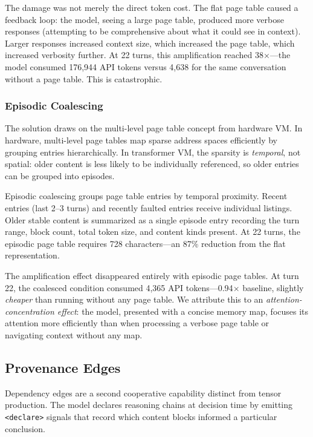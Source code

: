 \documentclass[sigplan,screen,anonymous]{acmart}
\begin{document}
The damage was not merely the direct token cost. The flat page table
caused a feedback loop: the model, seeing a large page table, produced
more verbose responses (attempting to be comprehensive about what it
could see in context). Larger responses increased context size, which
increased the page table, which increased verbosity further.
At 22 turns, this amplification reached 38$\times$---the model consumed
176,944 API tokens versus 4,638 for the same conversation without a
page table. This is catastrophic.

\subsubsection{Episodic Coalescing}

The solution draws on the multi-level page table concept from hardware
VM. In hardware, multi-level page tables map sparse address spaces
efficiently by grouping entries hierarchically. In transformer VM, the
sparsity is \emph{temporal}, not spatial: older content is less likely
to be individually referenced, so older entries can be grouped into
episodes.

Episodic coalescing groups page table entries by temporal proximity.
Recent entries (last 2--3 turns) and recently faulted entries receive
individual listings. Older stable content is summarized as a single
episode entry recording the turn range, block count, total token size,
and content kinds present. At 22 turns, the episodic page table
requires 728 characters---an 87\% reduction from the flat
representation.

The amplification effect disappeared entirely with episodic page
tables. At turn 22, the coalesced condition consumed 4,365 API
tokens---0.94$\times$ baseline, slightly \emph{cheaper} than running
without any page table. We attribute this to an
\emph{attention-concentration effect}: the model, presented with a
concise memory map, focuses its attention more efficiently than when
processing a verbose page table or navigating context without any map.

\subsection{Provenance Edges}
\label{sec:provenance}

Dependency edges are a second cooperative capability distinct from
tensor production. The model declares reasoning chains at decision
time by emitting \texttt{<declare>} signals that record which content
blocks informed a particular conclusion.
\end{document}
